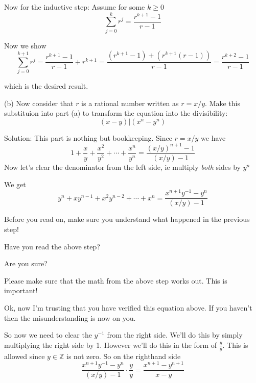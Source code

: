 \documentclass[16 pt]{amsart}
\theoremstyle{definition}
\theoremstyle{remark}
\numberwithin{equation}{subsection}
\newcommand{\Z}{\mathbb{Z}}
\begin{document}
Now for the inductive step: Assume for some $k\ge 0$
\[
\sum_{j=0}^{k} r^j = \frac{r^{k+1}-1}{r-1}
\]

Now we show
\[
\sum_{j=0}^{k+1} r^j = \frac{r^{k+1}-1}{r-1} + r^{k+1} = \frac{(r^{k+1}-1)+(r^{k+1}(r-1))}{r-1} = \frac{r^{k+2}-1}{r-1}
\]

which is the desired result.


\vspace{.5in}

(b) Now consider that $r$ is a rational number written as $r = x/y$.  Make this substituion into part (a) to transform the equation into the divisibility:
\[
(x-y) | (x^n - y^n)
\]

\vspace{.5in}

Solution: This part is nothing but bookkeeping.  Since $r=x/y$
we have
\[
1 + \frac{x}{y} + \frac{x^2}{y^2} + \cdots + \frac{x^n}{y^n} = \frac{(x/y)^{n+1}-1}{(x/y)-1}
\]
Now let's clear the denominator from the left side, ie multiply \emph{both} sides by $y^n$

We get
\[
y^n + xy^{n-1} + x^2y^{n-2} + \cdots + x^n = \frac{x^{n+1}y^{-1} - y^n}{(x/y)-1}
\]


Before you read on, make sure you understand what happened in the previous step!  

\vspace{.5in}

Have you read the above step?

\vspace{.5in}

Are you sure?

\vspace{.5in}

Please make sure that the math from the above step works out.  This is important!

\vspace{.5in}

Ok, now I'm trusting that you have verified this equation above.  If you haven't then the misunderstanding is now on you.

\vspace{.5in}


So now we need to clear the $y^{-1}$ from the right side.  We'll do this by simply multiplying the right side by 1.  However we'll do this in the form of $\frac{y}{y}$.  This is allowed since $y\in\Z$ is not zero.  So on the righthand side
\[
\frac{x^{n+1}y^{-1} - y^n}{(x/y)-1} \cdot \frac{y}{y} = \frac{x^{n+1}-y^{n+1}}{x-y}
\]
\end{document}
